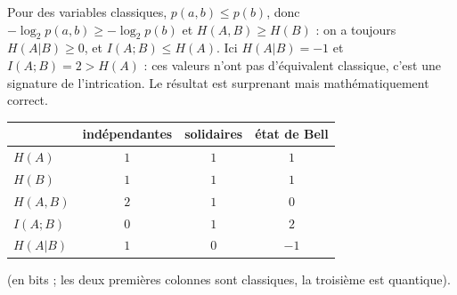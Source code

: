 \begin{remarque}
Pour des variables classiques, $p(a,b)\leq p(b)$, donc $-\log_2p(a,b)\geq-\log_2p(b)$ et
$H(A,B)\geq H(B)$ : on a toujours $H(A|B)\geq0$, et $I(A;B)\leq H(A)$. Ici $H(A|B)=-1$ et
$I(A;B)=2>H(A)$ : ces valeurs n'ont pas d'équivalent classique, c'est une signature de
l'intrication. Le résultat est surprenant mais mathématiquement correct.
\end{remarque}

\begin{center}
\renewcommand{\arraystretch}{1.4}
\begin{tabular}{@{}lccc@{}}
\toprule
 & indépendantes & solidaires & état de Bell \\
\midrule
$H(A)$ & $1$ & $1$ & $1$ \\
$H(B)$ & $1$ & $1$ & $1$ \\
$H(A,B)$ & $2$ & $1$ & $0$ \\
$I(A;B)$ & $0$ & $1$ & $2$ \\
$H(A|B)$ & $1$ & $0$ & $-1$ \\
\bottomrule
\end{tabular}
\end{center}
(en bits ; les deux premières colonnes sont classiques, la troisième est quantique).


